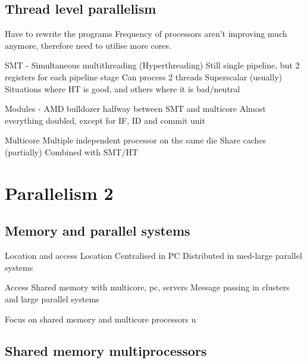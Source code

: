 \documentclass{article}
\begin{document}
	\subsection{Thread level parallelism}
		Have to rewrite the programs
		Frequency of processors aren't improving much anymore, therefore need to utilise more cores.

		SMT - Simultaneous multithreading (Hyperthreading)
			Still single pipeline, but 2 registers for each pipeline stage
			Can process 2 threads
			Superscalar (usually)
			Situations where HT is good, and others where it is bad/neutral

		Modules - AMD bulldozer
			halfway between SMT and multicore
			Almost everything doubled, except for IF, ID and commit unit

		Multicore
			Multiple independent processor on the same die
			Share caches (partially)
			Combined with SMT/HT

\section{Parallelism 2}
	\subsection{Memory and parallel systems}
		Location and access
			Location
				Centralised in PC
				Distributed in med-large parallel systems

			Access
				Shared memory with multicore, pc, servers
				Message passing in clusters and large parallel systems

			Focus on shared memory and multicore processors
			u






	\subsection{Shared memory multiprocessors}



































			
\end{document}
